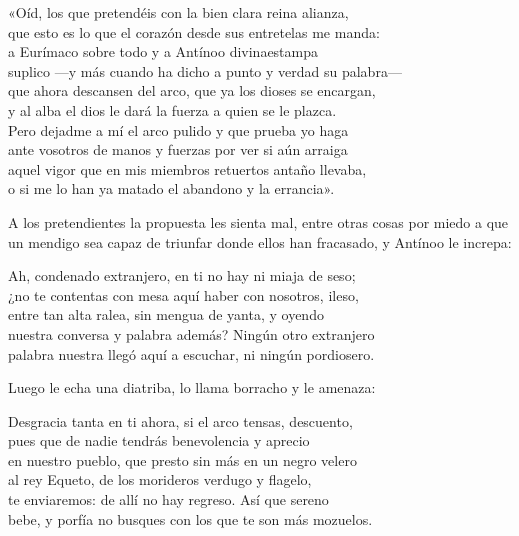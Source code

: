 \begin{versocita}
«Oíd, los que pretendéis con la bien clara reina alianza,\\
que esto es lo que el corazón desde sus entretelas me manda:\\
a Eurímaco sobre todo y a Antínoo divinaestampa\\
suplico ---y más cuando ha dicho a punto y verdad su palabra---\\
que ahora descansen del arco, que ya los dioses se encargan,\\
y al alba el dios le dará la fuerza a quien se le plazca.\\
Pero dejadme a mí el arco pulido y que prueba yo haga\\
ante vosotros de manos y fuerzas por ver si aún arraiga\\
aquel vigor que en mis miembros retuertos antaño llevaba,\\
o si me lo han ya matado el abandono y la errancia».
\end{versocita}

A los pretendientes la propuesta les sienta mal, entre otras cosas por miedo a que un mendigo sea capaz de triunfar donde ellos han fracasado, y Antínoo le increpa:

\begin{versocita}
Ah, condenado extranjero, en ti no hay ni miaja de seso;\\
¿no te contentas con mesa aquí haber con nosotros, ileso,\\
entre tan alta ralea, sin mengua de yanta, y oyendo\\
nuestra conversa y palabra además? Ningún otro extranjero\\
palabra nuestra llegó aquí a escuchar, ni ningún pordiosero.
\end{versocita}

Luego le echa una diatriba, lo llama borracho y le amenaza:

\begin{versocita}
Desgracia tanta en ti ahora, si el arco tensas, descuento,\\
pues que de nadie tendrás benevolencia y aprecio\\
en nuestro pueblo, que presto sin más en un negro velero\\
al rey Equeto, de los morideros verdugo y flagelo,\\
te enviaremos: de allí no hay regreso. Así que sereno\\
bebe, y porfía no busques con los que te son más mozuelos.
\end{versocita}

